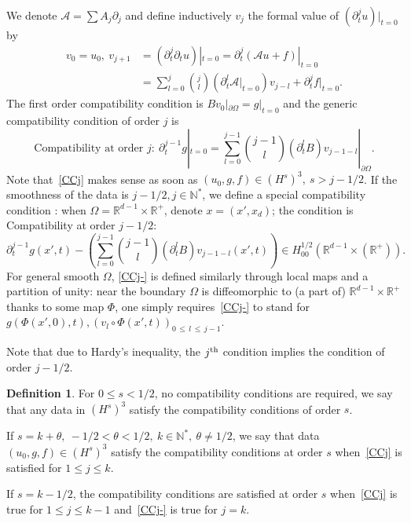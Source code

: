 \documentclass[10pt]{amsart}
\theoremstyle{definition}\newtheorem{defi}[theo]{Definition}\newtheorem{rema}[theo]{Remark}\newtheorem{exam}[theo]{Example}\newtheorem{exem}[theo]{Example}\newtheorem{nota}[theo]{Notation}
\newcommand{\R}{\mathbb{R}}
\newcommand{\N}{\mathbb{N}}
\newcommand{\clA}{\mathcal{A}}
\begin{document}
We denote $\clA=\sum A_j\partial_j$ and define inductively $v_j$ the formal value of $(\partial_t^ju)|_{t=0}$ by
\begin{equation}\label{taylor}
\begin{split}
v_0=u_0,\ v_{j+1}&=\left(\partial_t^j\partial_tu\right)|_{t=0} =\partial_t^j(\clA u+f)|_{t=0}\\ &=\sum_{l=0}^j\binom{j}{l} \left(\partial_t^l\clA|_{t=0}\right)v_{j-l}+\partial_t^jf|_{t=0}.
\end{split}
\end{equation}
The first order compatibility condition is $Bv_0|_{\partial\Omega}=g|_{t=0}$ and the generic compatibility condition of order $j$ is
\begin{equation}\label{CCj}
\text{Compatibility at order }j:\
\partial_t^{j-1}g|_{t=0}=\sum_{l=0}^{j-1}
\binom{j-1}{l}(\partial_t^lB)v_{j-1-l}|_{\partial\Omega}.
\end{equation}
Note that~\eqref{CCj} makes sense as soon as $(u_0,g,f)\in (H^s)^3,\ s>j-1/2$. If the smoothness of the data is $j-1/2, j\in \N^*$, we define a special compatibility condition : when $\Omega=\R^{d-1}\times \R^+$, denote $x=(x',x_d)$; the condition is Compatibility at order $j-1/2$:
\begin{equation}\label{CCj-}
\partial_t^{j-1}g(x',t)-\left(\sum_{l=0}^{j-1}
\binom{j-1}{l}(\partial_t^lB)v_{j-1-l}(x',t)\right)
\in H^{1/2}_{00}\left(\R^{d-1}\times (\R^+)\right).
\end{equation}
For general smooth $\Omega$, \eqref{CCj-} is defined similarly through local maps and a partition of unity: near the boundary $\Omega$ is diffeomorphic to (a part of) $\R^{d-1}\times \R^+$ thanks to some map $\Phi$, one simply requires~\eqref{CCj-} to stand for $g(\Phi(x',0),t), (v_l\circ\Phi(x',t))_{0\,\leq\,l\,\leq\,j-1}$.


Note that due to Hardy's inequality, the $j^{\rm th}$ condition implies the condition of order $j-1/2$.
\begin{defi}
For $0\leq s<1/2$, no compatibility conditions are required, we say that any data in $(H^s)^3$ satisfy the compatibility conditions of order $s$.


If $s=k+\theta,\ -1/2< \theta <1/2,\ k\in \N^*,\
\theta\neq 1/2$, we say that data $(u_0,g,f)\in (H^s)^3$ satisfy the compatibility conditions at order $s$ when~\eqref{CCj} is satisfied for $1\leq j\leq k$.


If $s=k-1/2$, the compatibility conditions are satisfied at order $s$ when~\eqref{CCj} is true for $1\leq j\leq k-1$ and~\eqref{CCj-} is true for $j=k$.
\end{defi}
\end{document}
